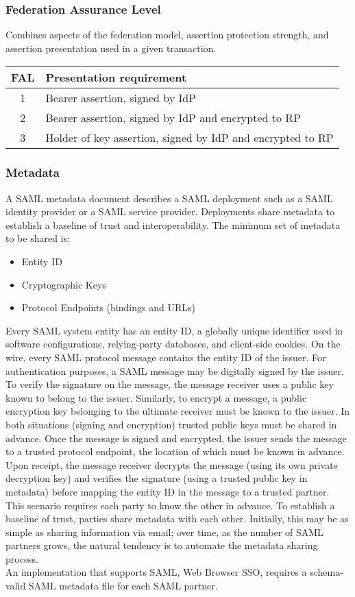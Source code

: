 \documentclass[a4paper, 10pt, titlepage]{article}
\begin{document}
\subsubsection*{Federation Assurance Level}
Combines aspects of the federation model, assertion protection strength, and assertion presentation used in a given transaction.
\begin{center}
\begin{tabular}{|c|l|} \hline
FAL & Presentation requirement \\ \hline
1 & Bearer assertion, signed by IdP \\
2 & Bearer assertion, signed by IdP and encrypted to RP\\
3 & Holder of key assertion, signed by IdP and encrypted to RP\\ \hline
\end{tabular}
\end{center}
\newpage
\subsubsection*{Metadata}
A SAML metadata document describes a SAML deployment such as a SAML identity provider or a SAML service provider. Deployments share metadata to establish a baseline of trust and interoperability. The minimum set of metadata to be shared is:
\begin{itemize}
\item Entity ID
\item Cryptographic Keys
\item Protocol Endpoints (bindings and URLs)
\end{itemize}
Every SAML system entity has an entity ID, a globally unique identifier used in software configurations, relying-party databases, and client-side cookies. On the wire, every SAML protocol message contains the entity ID of the issuer.
For authentication purposes, a SAML message may be digitally signed by the issuer. To verify the signature on the message, the message receiver uses a public key known to belong to the issuer. Similarly, to encrypt a message, a public encryption key belonging to the ultimate receiver must be known to the issuer. In both situations (signing and encryption) trusted public keys must be shared in advance. Once the message is signed and encrypted, the issuer sends the message to a trusted protocol endpoint, the location of which must be known in advance. Upon receipt, the message receiver decrypts the message (using its own private decryption key) and verifies the signature (using a trusted public key in metadata) before mapping the entity ID in the message to a trusted partner. This scenario requires each party to know the other in advance. To establish a baseline of trust, parties share metadata with each other. Initially, this may be as simple as sharing information via email; over time, as the number of SAML partners grows, the natural tendency is to automate the metadata sharing process.  \medskip\\ 
An implementation that supports SAML, Web Browser SSO, requires a schema-valid SAML metadata file for each SAML partner.
\end{document}
